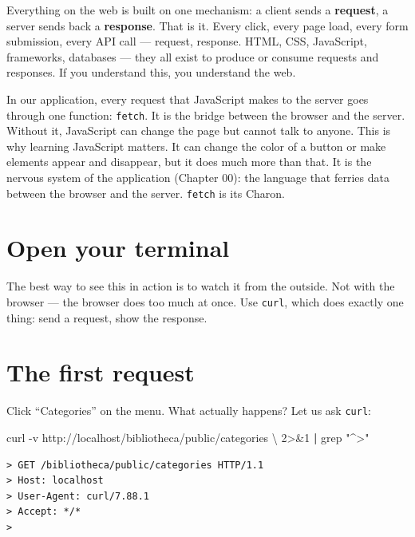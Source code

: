 \documentclass[11pt,a4paper,oneside]{book}
\newenvironment{Shaded}{\begin{snugshade}}{\end{snugshade}}
\newcommand{\KeywordTok}[1]{\textcolor[HTML]{007020}{\textbf{#1}}}
\newcommand{\DataTypeTok}[1]{\textcolor[HTML]{902000}{#1}}
\newcommand{\DecValTok}[1]{\textcolor[HTML]{40A070}{#1}}
\newcommand{\StringTok}[1]{\textcolor[HTML]{4070A0}{#1}}
\newcommand{\FunctionTok}[1]{\textcolor[HTML]{06287E}{#1}}
\newcommand{\OperatorTok}[1]{\textcolor[HTML]{666666}{#1}}
\newcommand{\ExtensionTok}[1]{#1}
\newcommand{\AttributeTok}[1]{\textcolor[HTML]{7D9029}{#1}}
\newcommand{\NormalTok}[1]{#1}
\begin{document}
Everything on the web is built on one mechanism: a client sends a
\textbf{request}, a server sends back a \textbf{response}. That
is it. Every click, every page load, every form submission, every
API call --- request, response. HTML, CSS, JavaScript,
frameworks, databases --- they all exist to produce or consume
requests and responses. If you understand this, you understand
the web.

In our application, every request that JavaScript makes to the
server goes through one function: \texttt{fetch}. It is the
bridge between the browser and the server. Without it, JavaScript
can change the page but cannot talk to anyone. This is why
learning JavaScript matters. It can change the color of a button
or make elements appear and disappear, but it does much more than
that. It is the nervous system of the application (Chapter 00):
the language that ferries data between the browser and the
server. \texttt{fetch} is its Charon.

\hypertarget{open-your-terminal}{%
\section{Open your terminal}\label{open-your-terminal}}

The best way to see this in action is to watch it from the
outside. Not with the browser --- the browser does too much at
once. Use \texttt{curl}, which does exactly one thing: send a
request, show the response.

\hypertarget{the-first-request}{%
\section{The first request}\label{the-first-request}}

Click ``Categories'' on the menu. What actually happens? Let us
ask \texttt{curl}:

\begin{Shaded}
\begin{Highlighting}[]
\ExtensionTok{curl} \AttributeTok{{-}v}\NormalTok{ http://localhost/bibliotheca/public/categories }\DataTypeTok{\textbackslash{}}
    \DecValTok{2}\OperatorTok{\textgreater{}\&}\DecValTok{1} \KeywordTok{|} \FunctionTok{grep} \StringTok{"\^{}\textgreater{}"}
\end{Highlighting}
\end{Shaded}

\begin{verbatim}
> GET /bibliotheca/public/categories HTTP/1.1
> Host: localhost
> User-Agent: curl/7.88.1
> Accept: */*
>
\end{verbatim}
\end{document}

